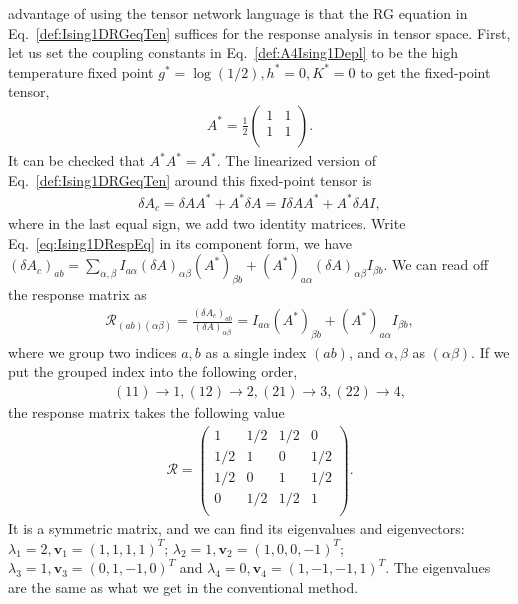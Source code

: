 \documentclass[aps,prb,reprint,superscriptaddress]{revtex4-2}
\begin{document}
advantage of using the tensor network language is that the RG equation in
Eq.~\eqref{def:Ising1DRGeqTen} suffices for the response analysis in
tensor space. First, let us set the coupling constants in
Eq.~\eqref{def:A4Ising1Depl} to be the high temperature fixed point
$g^* = \log{\left(1/2\right)}, h^*=0, K^* = 0$ to get the fixed-point
tensor,
%
\begin{align}\label{eq:fixedA4Ising1D}
    A^* = \frac{1}{2}
\begin{pmatrix}
    1 & 1 \\
    1 & 1 \\
\end{pmatrix}.
\end{align}
%
It can be checked that $A^* A^* = A^*$. The linearized version of
Eq.~\eqref{def:Ising1DRGeqTen} around this fixed-point tensor is
%
\begin{align}\label{eq:Ising1DRespEq}
    \delta A_c = \delta A A^* + A^* \delta A = I \delta A A^* + A^*
    \delta A I,
\end{align}
%
where in the last equal sign, we add two identity matrices. Write
Eq.~\eqref{eq:Ising1DRespEq} in its component form, we have
$\left(\delta A_c\right)_{ab} =
\sum_{\alpha,\beta}I_{a\alpha}\left(\delta A\right)_{\alpha\beta}
\left(A^*\right)_{\beta b} + \left(A^*\right)_{a\alpha} \left(\delta
A\right)_{\alpha \beta} I_{\beta b}$. We can read off the response
matrix as
%
\begin{align}\label{eq:Ising1DRespMat}
    \mathcal{R}_{(ab)(\alpha \beta)} = \frac{\left(\delta
    A_c\right)_{ab}}{\left(\delta A\right)_{\alpha \beta}} =
    I_{a\alpha}\left(A^*\right)_{\beta b} + \left(A^*\right)_{a\alpha}
    I_{\beta b},
\end{align}
%
where we group two indices $a,b$ as a single index $(ab)$, and
$\alpha,\beta$ as $(\alpha\beta)$. If we put the grouped index into the
following order,
%
\begin{align}\label{def:orderConvention}
    (11) \rightarrow 1, (12) \rightarrow 2, (21) \rightarrow 3, (22)
    \rightarrow 4,
\end{align}
%
the response matrix takes the following value
%
\begin{align}\label{eq:Ising1DRespMatNum}
    \mathcal{R} = 
\begin{pmatrix}
    1 & 1/2 & 1/2 & 0 \\
    1/2 & 1 & 0 & 1/2 \\
    1/2 & 0 & 1 & 1/2 \\
    0 & 1/2 & 1/2 & 1 \\
\end{pmatrix}.
\end{align}
%
It is a symmetric matrix, and we can find its eigenvalues and
eigenvectors: $\lambda_1 = 2,\mathbf{v}_1 = (1,1,1,1)^T$; $\lambda_2 =
1,\mathbf{v}_2 = (1,0,0,-1)^T$; $\lambda_3 =1, \mathbf{v}_3 =
(0,1,-1,0)^T$ and $\lambda_4 = 0, \mathbf{v}_4 = (1,-1,-1,1)^T$. The
eigenvalues are the same as what we get in the conventional method. 
%
\end{document}
